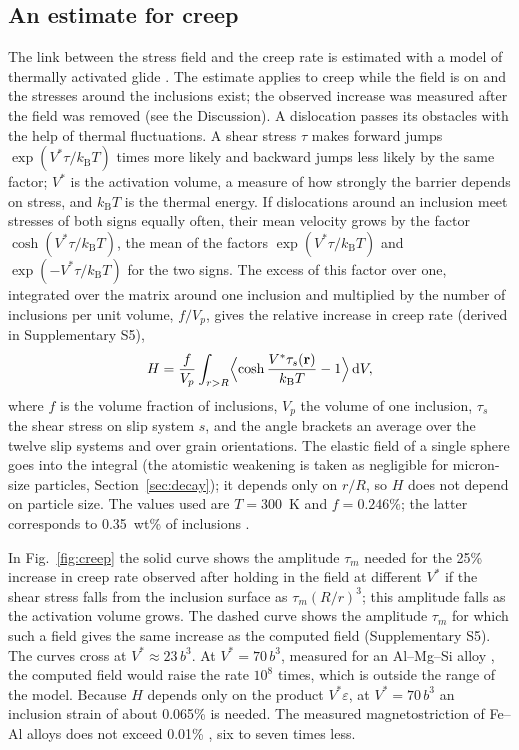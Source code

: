 \documentclass[11pt,a4paper]{article}
\begin{document}
\subsection{An estimate for creep}

The link between the stress field and the creep rate is estimated with a model
of thermally activated glide \cite{KocksArgonAshby1975,CaillardMartin2003}.
The estimate applies to creep while the field is on and the stresses around
the inclusions exist; the observed increase was measured after the field was
removed (see the Discussion).
A dislocation passes its obstacles with the help of thermal fluctuations. A
shear stress $\tau$ makes forward jumps $\exp(V^*\tau/k_{\mathrm B}T)$ times
more likely and backward jumps less likely by the same factor; $V^*$ is the
activation volume, a measure of how strongly the barrier depends on stress,
and $k_{\mathrm B}T$ is the thermal energy. If dislocations around an
inclusion meet stresses of both signs equally often, their mean velocity grows
by the factor $\cosh(V^*\tau/k_{\mathrm B}T)$, the mean of the factors
$\exp(V^*\tau/k_{\mathrm B}T)$ and $\exp(-V^*\tau/k_{\mathrm B}T)$ for the two
signs. The excess of this factor over one, integrated over the matrix around
one inclusion and multiplied by the number of inclusions per unit volume,
$f/V_p$, gives the relative increase in creep rate (derived in
Supplementary S5),
\begin{equation}
H=\frac{f}{V_p}\int_{r>R}
\Bigl\langle\cosh\frac{V^*\tau_s(\mathbf r)}{k_{\mathrm B}T}-1\Bigr\rangle
\,\mathrm dV ,
\label{eq:creep}
\end{equation}
where $f$ is the volume fraction of inclusions, $V_p$ the volume of one
inclusion, $\tau_s$ the shear stress on slip system $s$, and the angle
brackets an average over the twelve slip systems and over grain orientations.
The elastic field of a single sphere goes into the integral (the atomistic
weakening is taken as negligible for micron-size particles,
Section~\ref{sec:decay}); it depends only
on $r/R$, so $H$ does not depend on particle size. The values used are
$T=300$~K and $f=0.246\%$; the latter corresponds to 0.35~wt\% of inclusions
\cite{Friha2024JMMM}.

In Fig.~\ref{fig:creep} the solid curve shows the amplitude $\tau_m$ needed for
the 25\% increase in creep rate observed after holding in the field
\cite{Skvortsov2019JAP} at different $V^*$ if the shear stress
falls from the inclusion surface as $\tau_m(R/r)^3$; this amplitude falls as
the activation volume grows. The dashed curve shows the amplitude $\tau_m$ for
which such a field gives the same increase as the computed field
(Supplementary S5). The curves cross at $V^*\approx23\,b^3$. At $V^*=70\,b^3$, measured for
an Al--Mg--Si alloy \cite{Soula2022JALCOM}, the computed field would raise the
rate $10^8$ times, which is outside the range of the model. Because $H$ depends only on the
product $V^*\varepsilon$, at $V^*=70\,b^3$ an inclusion strain of about
0.065\% is needed. The measured magnetostriction of Fe--Al alloys does not
exceed 0.01\% \cite{Hall1959,BormioNunes2012}, six to seven times less.
\end{document}
